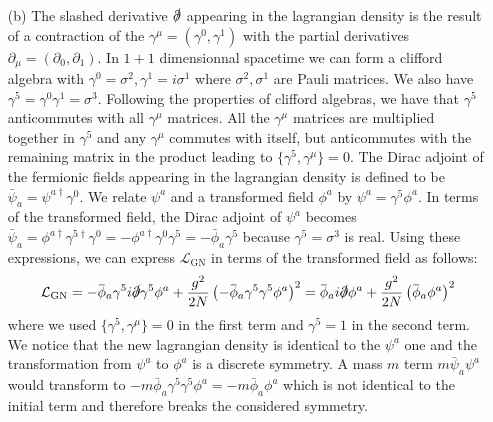 \documentclass[10pt, a4paper]{article}
\begin{document}
\begin{enumerate}
  \item[(b)] The slashed derivative $\slashed{\partial}$ appearing in the lagrangian density is the result of a contraction of the $\gamma^\mu = (\gamma^0, \gamma^1)$ with the partial derivatives $\partial_\mu = (\partial_0, \partial_1)$. In $1+1$ dimensionnal spacetime we can form a clifford algebra with $\gamma^0 = \sigma^2, \gamma^1 = i \sigma^1$ where $\sigma^2, \sigma^1$ are Pauli matrices. We also have $\gamma^5 = \gamma^0 \gamma^1 = \sigma^3$. Following the properties of clifford algebras, we have that $\gamma^5$ anticommutes with all $\gamma^\mu$ matrices. All the $\gamma^\mu$ matrices are multiplied together in $\gamma^5$ and any $\gamma^\mu$ commutes with itself, but anticommutes with the remaining matrix in the product leading to $\{\gamma^5, \gamma^\mu\} = 0$. The Dirac adjoint of the fermionic fields appearing in the lagrangian density is defined to be $\bar{\psi}_a = \psi^{a\dagger} \gamma^0$.  We relate $\psi^{a}$ and a transformed field $\phi^{a}$ by $\psi^{a} = \gamma^5 \phi^{a}$. In terms of the transformed field, the  Dirac adjoint of $\psi^{a}$ becomes $\bar{\psi}_a = \phi^{a\dagger}\gamma^{5\dagger} \gamma^0 = -\phi^{a\dagger} \gamma^0 \gamma^{5} = -\bar{\phi}_a \gamma^5$ because $\gamma^5 = \sigma^3$ is real. Using these expressions, we can express $\mathcal{L}_{\mathrm{GN}}$ in terms of the transformed field as follows: 
  \begin{align*}
    \mathcal{L}_{\mathrm{GN}}=-\bar{\phi}_a \gamma^5 i \slashed{\partial} \gamma^5 \phi^a+\frac{g^2}{2 N}\left(-\bar{\phi}_a \gamma^5 \gamma^5 \phi^a\right)^2 = \bar{\phi}_a i \slashed{\partial}  \phi^a+\frac{g^2}{2 N}\left(\bar{\phi}_a \phi^a\right)^2  
  \end{align*}
  where we used $\{\gamma^5, \gamma^\mu\} = 0$ in the first term and $\gamma^5 = 1$ in the second term. We notice that the new lagrangian density is identical to the $\psi^a$ one and the transformation from $\psi^a$ to $\phi^a$ is a discrete symmetry. A mass $m$ term $m \bar{\psi}_a \psi^a$ would transform to $-m \bar{\phi}_a \gamma^5 \gamma^5 \phi^a = -m \bar{\phi}_a \phi^a$ which is not identical to the initial term and therefore breaks the considered symmetry. 

\end{enumerate}
\end{document}
